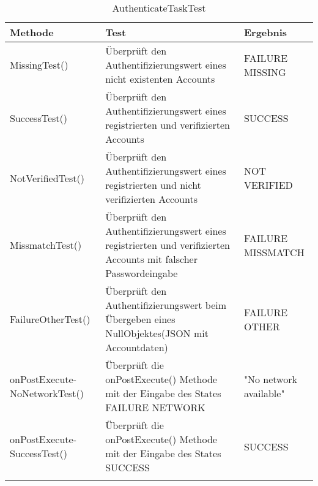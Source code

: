 \begin{longtable}{p{} | p{} | p{}}
\hline
  \textbf{Methode} & \textbf{Test} & \textbf{Ergebnis}\\
  \hline
  MissingTest() & Überprüft den Authentifizierungswert eines nicht existenten Accounts & FAILURE MISSING \\
  \hline
  SuccessTest() & Überprüft den Authentifizierungswert eines registrierten und verifizierten Accounts & SUCCESS \\
  \hline
  NotVerifiedTest() & Überprüft den Authentifizierungswert eines registrierten und nicht verifizierten Accounts & NOT VERIFIED \\
  \hline
  MissmatchTest() & Überprüft den Authentifizierungswert eines registrierten und verifizierten Accounts mit falscher Passwordeingabe & FAILURE MISSMATCH \\
  \hline
  FailureOtherTest() & Überprüft den Authentifizierungswert beim Übergeben eines NullObjektes(JSON mit Accountdaten) & FAILURE OTHER \\
  \hline
   onPostExecute- \newline NoNetworkTest() & Überprüft die onPostExecute() Methode mit der Eingabe des States FAILURE NETWORK & "No network available" \\
  \hline
  onPostExecute- \newline SuccessTest() & Überprüft die onPostExecute() Methode mit der Eingabe des States SUCCESS & SUCCESS \\
  \hline
  \caption{AuthenticateTaskTest}
 \end{longtable}
 
